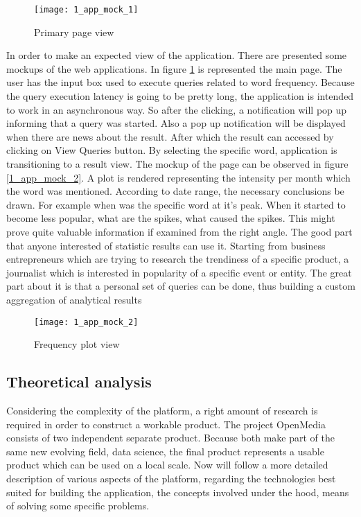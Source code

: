\begin{figure}[!ht]
\centering
\texttt{[image: 1\_app\_mock\_1]}
\caption{Primary page view}\label{app_mock_1}
\end{figure}

In order to make an expected view of the application. There are presented some mockups of the web applications. In figure \ref{app_mock_1} is represented the main page. The user has the input box used to execute queries related to word frequency. Because the query execution latency is going to be pretty long, the application is intended to work in an asynchronous way. So after the clicking, a notification will pop up informing that a query was started. Also a pop up notification will be displayed when there are news about the result. After which the result can accessed by clicking on View Queries button. By selecting the specific word, application is transitioning to a result view. The mockup of the page can be observed in figure \ref{1_app_mock_2}. A  plot is rendered representing the intensity per month which the word was mentioned. According to date range, the necessary conclusions be drawn. For example when was the specific word at it's peak. When it started to become less popular, what are the spikes, what caused the spikes. This might prove quite valuable information if examined from the right angle. The good part that anyone interested of statistic results can use it. Starting from business entrepreneurs which are trying to research the trendiness of a specific product, a journalist which is interested in popularity of a specific event or entity. The great part about it is that a personal set of queries can be done, thus building a custom aggregation of analytical results

\begin{figure}[!ht]
\centering
\texttt{[image: 1\_app\_mock\_2]}
\caption{Frequency plot view}\label{app_mock_2}
\end{figure}

\subsection{Theoretical analysis}
Considering the complexity of the platform, a right amount of research is required in order to construct a workable product. The project OpenMedia consists of two independent separate product. Because both make part of the same new evolving field, data science, the final product represents a usable product which can be used on a local scale. Now will follow a more detailed description of various aspects of the platform, regarding the technologies best suited for building the application, the concepts involved under the hood, means of solving some specific problems.

